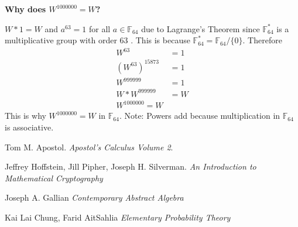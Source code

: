 \documentclass[12pt,letterpaper]{article}
\begin{document}
\textbf{Why does $W^{1000000}=W$?}

$W*1=W$ and $a^{63}=1$ for all $a\in\mathbb{F}_{64}$ due to Lagrange's Theorem since $\mathbb{F}_{64}^*$ is a multiplicative group with order 63 \cite{Algebra}. This is because $\mathbb{F}_{64}^*=\mathbb{F}_{64}/\{0\}$. Therefore 
\begin{align*}
    W^{63}&=1\\
    (W^{63})^{15873}&=1\\
    W^{999999}&=1\\
    W*W^{999999}&=W\\
    W^{1000000}=W
\end{align*}
This is why $W^{1000000}=W$ in $\mathbb{F}_{64}$. Note: Powers add because multiplication in $\mathbb{F}_{64}$ is associative.

\begin{thebibliography}{9}
Tom M. Apostol. 
\textit{Apostol's Calculus Volume 2}. 
 
Jeffrey Hoffstein, Jill Pipher, Joseph H. Silverman.
\textit{An Introduction to Mathematical Cryptography}
 
Joseph A. Gallian
\textit{Contemporary Abstract Algebra}

Kai Lai Chung, Farid AitSahlia
\textit{Elementary Probability Theory}

\end{thebibliography}
\end{document}
